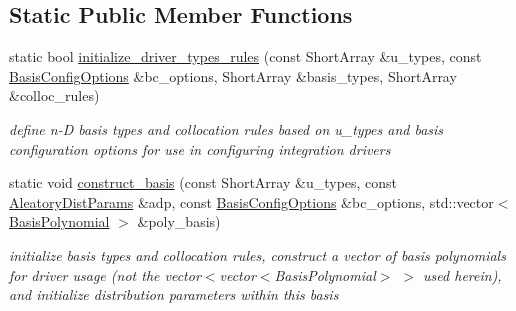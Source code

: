 \subsection*{Static Public Member Functions}
\begin{DoxyCompactItemize}
\item 
static bool \hyperlink{classPecos_1_1SharedInterpPolyApproxData_a6cdac92e4b4313f2a73677c9c39fdb3f}{initialize\+\_\+driver\+\_\+types\+\_\+rules} (const Short\+Array \&u\+\_\+types, const \hyperlink{classPecos_1_1BasisConfigOptions}{Basis\+Config\+Options} \&bc\+\_\+options, Short\+Array \&basis\+\_\+types, Short\+Array \&colloc\+\_\+rules)
\begin{DoxyCompactList}\small\item\em define n-\/D basis types and collocation rules based on u\+\_\+types and basis configuration options for use in configuring integration drivers \end{DoxyCompactList}\item 
static void \hyperlink{classPecos_1_1SharedInterpPolyApproxData_aa89044de171121ba6852986b1e308dc7}{construct\+\_\+basis} (const Short\+Array \&u\+\_\+types, const \hyperlink{classPecos_1_1AleatoryDistParams}{Aleatory\+Dist\+Params} \&adp, const \hyperlink{classPecos_1_1BasisConfigOptions}{Basis\+Config\+Options} \&bc\+\_\+options, std\+::vector$<$ \hyperlink{classPecos_1_1BasisPolynomial}{Basis\+Polynomial} $>$ \&poly\+\_\+basis)\label{classPecos_1_1SharedInterpPolyApproxData_aa89044de171121ba6852986b1e308dc7}

\begin{DoxyCompactList}\small\item\em initialize basis types and collocation rules, construct a vector of basis polynomials for driver usage (not the vector$<$vector$<$\+Basis\+Polynomial$>$ $>$ used herein), and initialize distribution parameters within this basis \end{DoxyCompactList}\end{DoxyCompactItemize}

